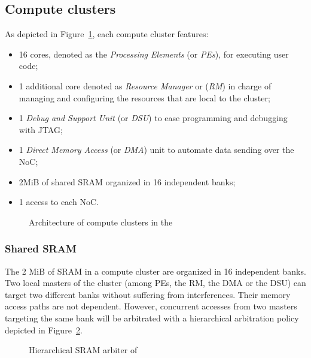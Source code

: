 \documentclass[main.tex]{subfiles}
\begin{document}
\subsection{Compute clusters}
As depicted in Figure~\ref{fig_execModel_MPPAComputeCluster}, each compute cluster features:
\begin{itemize}
    \item 16 cores, denoted as the \emph{Processing Elements} (or \emph{PEs}), for executing user code;
    \item 1 additional core denoted as \emph{Resource Manager} or (\emph{RM}) in charge of managing and configuring the resources that are local to the cluster;
    \item 1 \emph{Debug and Support Unit} (or \emph{DSU}) to ease programming and debugging with JTAG;
    \item 1 \emph{Direct Memory Access} (or \emph{DMA}) unit to automate data sending over the NoC;
    \item 2MiB of shared SRAM organized in 16 independent banks;
    \item 1 access to each NoC.
\end{itemize}



\begin{figure}
    \centering
    \scalebox{0.8}{}
    \caption{Architecture of compute clusters in the \mppalong}
    \label{fig_execModel_MPPAComputeCluster}
\end{figure}


\subsubsection{Shared SRAM}
The 2 MiB of SRAM in a compute cluster are organized in 16 independent banks. Two local masters of the cluster (among PEs, the RM, the DMA or the DSU) can target two different banks without suffering from interferences. Their memory access paths are not dependent. However, concurrent accesses from two masters targeting the same bank will be arbitrated with a hierarchical arbitration policy depicted in Figure~\ref{fig_execModel_MPPASMEMarbiter}.
\begin{figure}
    \centering
    \scalebox{0.8}{}
    \caption{Hierarchical SRAM arbiter of \mppalong}
    \label{fig_execModel_MPPASMEMarbiter}
\end{figure}
\end{document}
